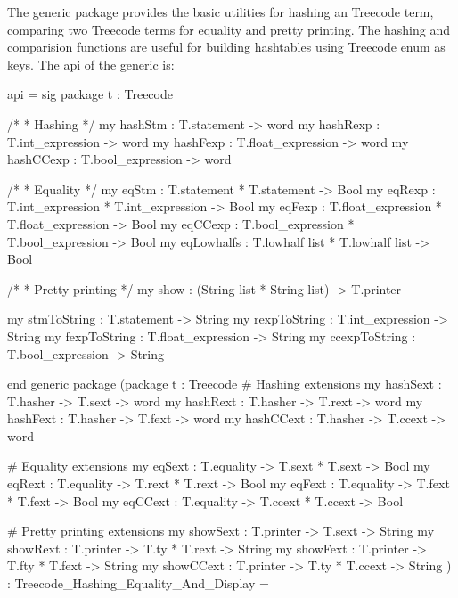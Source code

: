The generic package  provides
the basic utilities for hashing an Treecode term, comparing two
Treecode terms for equality and pretty printing.  The hashing and comparision
functions are useful for building hashtables using Treecode enum as keys.
The api of the generic is:
\begin{SML}
api  =
sig
   package t : Treecode 

   /*
    * Hashing
    */
   my hashStm   : T.statement -> word
   my hashRexp  : T.int_expression -> word
   my hashFexp  : T.float_expression -> word
   my hashCCexp : T.bool_expression -> word

   /*
    * Equality
    */
   my eqStm     : T.statement * T.statement -> Bool
   my eqRexp    : T.int_expression * T.int_expression -> Bool
   my eqFexp    : T.float_expression * T.float_expression -> Bool
   my eqCCexp   : T.bool_expression * T.bool_expression -> Bool
   my eqLowhalfs : T.lowhalf list * T.lowhalf list -> Bool

   /*
    * Pretty printing 
    */
   my show : (String list * String list) -> T.printer

   my stmToString   : T.statement -> String
   my rexpToString  : T.int_expression -> String
   my fexpToString  : T.float_expression -> String
   my ccexpToString : T.bool_expression -> String

end
generic package  
  (package t : Treecode
   #  Hashing extensions 
   my hashSext  : T.hasher -> T.sext -> word
   my hashRext  : T.hasher -> T.rext -> word
   my hashFext  : T.hasher -> T.fext -> word
   my hashCCext : T.hasher -> T.ccext -> word

   #  Equality extensions 
   my eqSext  : T.equality -> T.sext * T.sext -> Bool
   my eqRext  : T.equality -> T.rext * T.rext -> Bool
   my eqFext  : T.equality -> T.fext * T.fext -> Bool
   my eqCCext : T.equality -> T.ccext * T.ccext -> Bool

   #  Pretty printing extensions 
   my showSext  : T.printer -> T.sext -> String
   my showRext  : T.printer -> T.ty * T.rext -> String
   my showFext  : T.printer -> T.fty * T.fext -> String
   my showCCext : T.printer -> T.ty * T.ccext -> String
  ) : Treecode_Hashing_Equality_And_Display =
\end{SML} 

